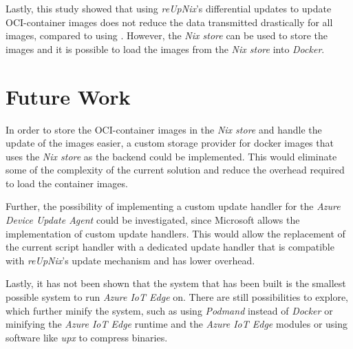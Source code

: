 Lastly, this study showed that using
\textit{reUpNix}'s differential updates to update \ac{OCI}-container images
does not reduce the data transmitted drastically for all images, compared to using
. However, the \textit{Nix store} can be used to store the images
and it is possible to load the images from the \textit{Nix store} into \textit{Docker}.


\section{Future Work}
In order to store the \ac{OCI}-container images in the \textit{Nix store} and
handle the update of the images easier, a custom storage provider for docker images
that uses the \textit{Nix store} as the backend could be implemented.
This would eliminate some of the complexity of the current solution and reduce
the overhead required to load the container images.

Further, the possibility of implementing a custom update handler for
the \textit{Azure Device Update Agent} could be investigated, since Microsoft allows
the implementation of custom update handlers. This would allow the replacement of the
current script handler with a dedicated update handler that is compatible
with \textit{reUpNix}'s update mechanism and has lower overhead.

Lastly, it has not been shown that the system that has been built is the smallest possible
system to run \textit{Azure IoT Edge} on. There are still possibilities to explore, which
further minify the system, such as using \textit{Podmand} instead of \textit{Docker}
or minifying the \textit{Azure IoT Edge} runtime and the \textit{Azure IoT Edge} modules
or using software like \textit{upx} to compress binaries.
